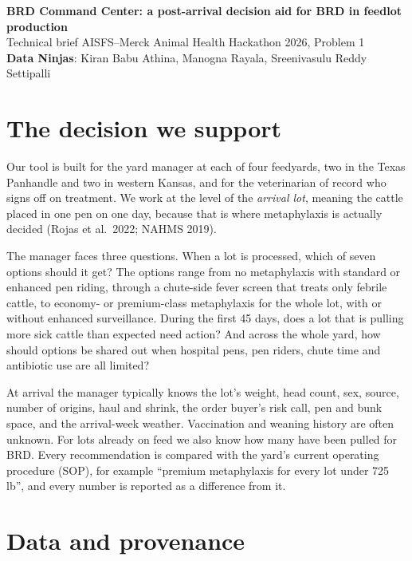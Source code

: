 \documentclass[10pt,letterpaper]{article}
\newcommand{\teamname}{Data Ninjas}
\newcommand{\teammembers}{Kiran Babu Athina, Manogna Rayala, Sreenivasulu Reddy Settipalli}
\begin{document}
\begin{center}
  {\Large\bfseries\color{accent} BRD Command Center: a post-arrival decision aid for BRD in feedlot production}\\[3pt]
  {\small Technical brief \textbullet{} AISFS--Merck Animal Health Hackathon 2026, Problem 1}\\[1pt]
  {\small\textbf{\teamname}: \teammembers}
\end{center}

\section{The decision we support}

Our tool is built for the yard manager at each of four feedyards, two in the Texas Panhandle and two in western Kansas, and for the veterinarian of record who signs off on treatment. We work at the level of the \emph{arrival lot}, meaning the cattle placed in one pen on one day, because that is where metaphylaxis is actually decided (Rojas et al.\ 2022; NAHMS 2019).

The manager faces three questions. When a lot is processed, which of seven options should it get? The options range from no metaphylaxis with standard or enhanced pen riding, through a chute-side fever screen that treats only febrile cattle, to economy- or premium-class metaphylaxis for the whole lot, with or without enhanced surveillance. During the first 45 days, does a lot that is pulling more sick cattle than expected need action? And across the whole yard, how should options be shared out when hospital pens, pen riders, chute time and antibiotic use are all limited?

At arrival the manager typically knows the lot's weight, head count, sex, source, number of origins, haul and shrink, the order buyer's risk call, pen and bunk space, and the arrival-week weather. Vaccination and weaning history are often unknown. For lots already on feed we also know how many have been pulled for BRD. Every recommendation is compared with the yard's current operating procedure (SOP), for example ``premium metaphylaxis for every lot under 725\,lb'', and every number is reported as a difference from it.

\section{Data and provenance}
\end{document}

